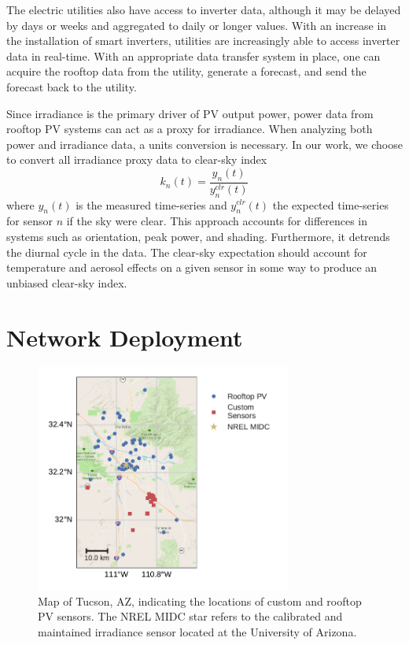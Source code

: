 The electric utilities also have access to inverter data, although it
may be delayed by days or weeks and aggregated to daily or longer values.
With an increase in the installation of smart inverters, utilities are
increasingly able to access inverter data in real-time.
With an appropriate data transfer system in place, one can acquire
the rooftop data from the utility, generate a forecast, and send the
forecast back to the utility.

Since irradiance is the primary driver of PV output power, power data
from rooftop PV systems can act as a proxy for irradiance.
When analyzing both power and irradiance data, a units conversion is
necessary.
In our work, we choose to convert all irradiance proxy data to
clear-sky index
\begin{equation}
\label{eq:clrind}
k_n(t) = \frac{y_n(t)}{y_n^{clr}(t)}
\end{equation}
where $y_n(t)$ is the measured time-series and $y_n^{clr}(t)$ the
expected time-series for sensor $n$ if the sky were clear.
This approach accounts for differences in systems such as orientation,
peak power, and shading.
Furthermore, it detrends the diurnal cycle in the data.
The clear-sky expectation should account for temperature and aerosol
effects on a given sensor in some way to produce an unbiased clear-sky
index.

\section{Network Deployment}
\begin{figure}[h]
\centering
\includegraphics[width=0.75\textwidth]{figs/map.pdf}
\caption[Map of sensor locations]{Map of Tucson, AZ, indicating the
  locations of custom and rooftop PV sensors. The NREL MIDC star
  refers to the calibrated and maintained irradiance sensor located at
  the University of Arizona.}
\label{fig:map}
\end{figure}

